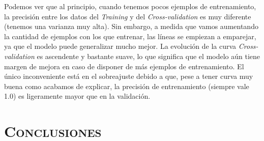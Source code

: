 \documentclass[11pt,a4paper]{article}
\begin{document}
Podemos ver que al principio, cuando tenemos pocos ejemplos de entrenamiento, la precisión entre los datos del \textit{Training} y del
\textit{Cross-validation} es muy diferente (tenemos una varianza muy alta). Sin embargo, a medida que vamos aumentando la cantidad de
ejemplos con los que entrenar, las líneas se empiezan a emparejar, ya que el modelo puede generalizar mucho mejor. La evolución de la curva
\textit{Cross-validation} es ascendente y bastante suave, lo que significa que el modelo aún tiene margen de mejora en caso de disponer de
más ejemplos de entrenamiento. El único inconveniente está en el sobreajuste debido a que, pese a tener curva muy buena como acabamos de explicar, la precisión de entrenamiento (siempre vale 1.0) es ligeramente mayor que en la validación.

\section{\textsc{Conclusiones}}



\newpage
\end{document}
